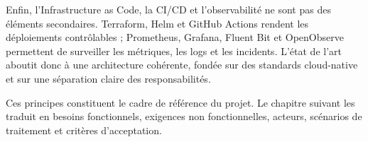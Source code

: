 Enfin, l'Infrastructure as Code, la CI/CD et l'observabilité ne sont pas des éléments secondaires. Terraform, Helm et GitHub Actions rendent les déploiements contrôlables ; Prometheus, Grafana, Fluent Bit et OpenObserve permettent de surveiller les métriques, les logs et les incidents. L'état de l'art aboutit donc à une architecture cohérente, fondée sur des standards cloud-native et sur une séparation claire des responsabilités.

Ces principes constituent le cadre de référence du projet. Le chapitre suivant les traduit en besoins fonctionnels, exigences non fonctionnelles, acteurs, scénarios de traitement et critères d'acceptation.

\clearpage
